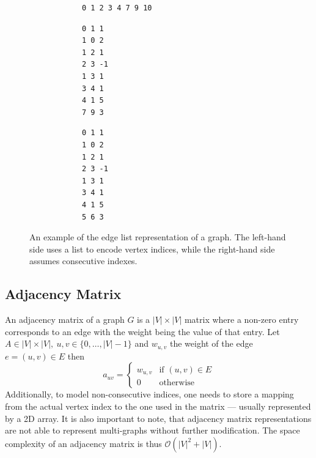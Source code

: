             \begin{figure}[htp]
            \begin{center}
            \begin{minipage}{0.5\textwidth}
            \begin{verbatim}
            0 1 2 3 4 7 9 10
            \end{verbatim}
            \begin{verbatim}
            0 1 1
            1 0 2
            1 2 1
            2 3 -1
            1 3 1
            3 4 1
            4 1 5
            7 9 3
            \end{verbatim}
            \end{minipage}%
            \hfill%
            \begin{minipage}{0.5\textwidth}
            \begin{verbatim}
            0 1 1
            1 0 2
            1 2 1
            2 3 -1
            1 3 1
            3 4 1
            4 1 5
            5 6 3
            \end{verbatim}
            \end{minipage}
            \end{center}
            \caption{%
                An example of the edge list representation of a graph.%
                The left-hand side uses a list to encode vertex indices, while the right-hand side assumes consecutive indexes.%
            }
            \label{edgelist}
            \end{figure}

        \subsection*{Adjacency Matrix}
            An adjacency matrix of a graph $G$ is a $|V|\times|V|$ matrix where a non-zero entry corresponds to an edge with the weight being the value of that entry. 
            Let $A \in |V|\times|V|, \ u, v \in \{0, \dots, |V| - 1\}$ and $w_{u,v}$ the weight of the edge $e = (u,v) \in E$ then
            \[ a_{uv} = \begin{cases}
                        w_{u,v} & \text{if } (u,v) \in E \\
                        0 & \text{otherwise}
                        \end{cases}
            \]
            Additionally, to model non-consecutive indices, one needs to store a mapping from the actual vertex index to the one used in the matrix --- usually represented by a 2D array. 
            It is also important to note, that adjacency matrix representations are not able to represent multi-graphs without further modification.
            The space complexity of an adjacency matrix is thus $\mathcal{O}(|V|^2 + |V|)$.
                    
